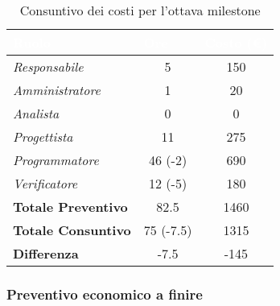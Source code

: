 \begin{table}[H]
    \renewcommand\arraystretch{1.5}
    \centering
    \begin{tabular}{|l|c|c|}
    \hline
    \rowcolor[HTML]{036400}
    \textcolor{white}{\textbf{Ruolo}} & \multicolumn{1}{l|}{\textcolor{white}{\textbf{Ore}}} & \multicolumn{1}{l|}{\textcolor{white}{\textbf{Costo (€)}}} \\ \hline
    \rowcolor[HTML]{EFEFEF}\textit{Responsabile}      & 5         & 150                 \\ \hline
    \rowcolor[HTML]{C0C0C0}\textit{Amministratore}    & 1         & 20                \\ \hline
    \rowcolor[HTML]{EFEFEF}\textit{Analista}          & 0         & 0                 \\ \hline
    \rowcolor[HTML]{C0C0C0}\textit{Progettista}       & 11        & 275                 \\ \hline
    \rowcolor[HTML]{EFEFEF}\textit{Programmatore}     & 46 (-2)   & 690                 \\ \hline
    \rowcolor[HTML]{C0C0C0}\textit{Verificatore}      & 12 (-5)   & 180                 \\ \hline
    \rowcolor[HTML]{EFEFEF}\textbf{Totale Preventivo} & 82.5      & 1460                \\ \hline
    \rowcolor[HTML]{C0C0C0}\textbf{Totale Consuntivo} & 75 (-7.5) & 1315                \\ \hline
    \rowcolor[HTML]{EFEFEF}\textbf{Differenza}        & -7.5      & -145                \\ \hline
    \end{tabular}
    \caption{Consuntivo dei costi per l'ottava milestone}
\end{table}

\subsubsection{Preventivo economico a finire}

